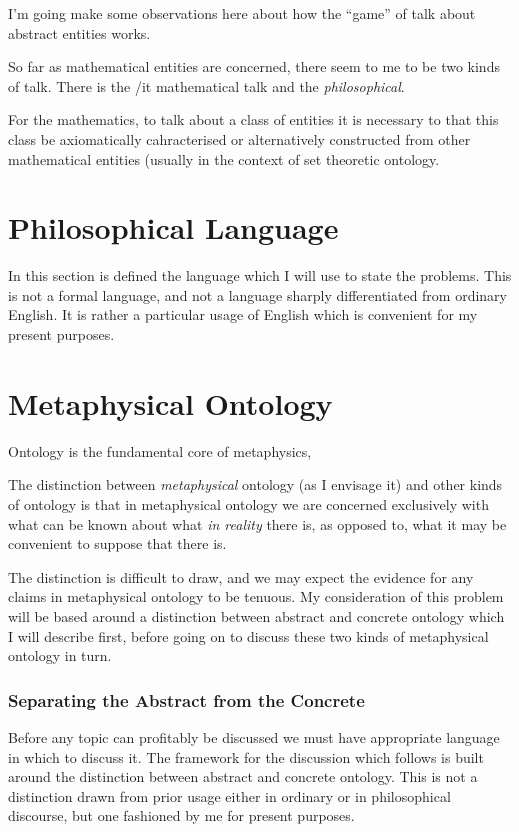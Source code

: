 \documentclass{rbjk}
\begin{document}
\begin{article}
I'm going make some observations here about how the ``game'' of talk about abstract entities works. 

So far as mathematical entities are concerned, there seem to me to be two kinds of talk.
There is the {/it mathematical} talk and the {\it philosophical}.

For the mathematics, to talk about a class of entities it is necessary to that this class be axiomatically cahracterised or alternatively constructed from other mathematical entities (usually in the context of set theoretic ontology.

\part{Philosophical Language}

In this section is defined the language which I will use to state the problems.
This is not a formal language, and not a language sharply differentiated from ordinary English.
It is rather a particular usage of English which is convenient for my present purposes.

\part{Metaphysical Ontology}

Ontology is the fundamental core of metaphysics,

The distinction between \emph{metaphysical} ontology (as I envisage it) and other kinds of ontology is that in metaphysical ontology we are concerned exclusively with what can be known about what \emph{in reality} there is, as opposed to, what it may be convenient to suppose that there is.

The distinction is difficult to draw, and we may expect the evidence for any claims in metaphysical ontology to be tenuous.
My consideration of this problem will be based around a distinction between abstract and concrete ontology which I will describe first, before going on to discuss these two kinds of metaphysical ontology in turn.

\section{Separating the Abstract from the Concrete}

Before any topic can profitably be discussed we must have appropriate language in which to discuss it.
The framework for the discussion which follows is built around the distinction between abstract and concrete ontology.
This is not a distinction drawn from prior usage either in ordinary or in philosophical discourse, but one fashioned by me for present purposes.


\end{article}
\end{document}
